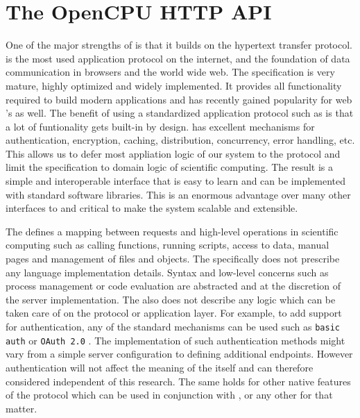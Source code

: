 \section{The OpenCPU HTTP API}

One of the major strengths of \OpenCPU is that it builds on the hypertext transfer protocol. \HTTP is the most used application protocol on the internet, and the foundation of data communication in browsers and the world wide web. The \HTTP specification is very mature, highly optimized and widely implemented. It provides all functionality required to build modern applications and has recently gained popularity for web \API's as well. The benefit of using a standardized application protocol such as \HTTP is that a lot of funtionality gets built-in by design. \HTTP has excellent mechanisms for authentication, encryption, caching, distribution, concurrency, error handling, etc. This allows us to defer most appliation logic of our system to the protocol and limit the \API specification to domain logic of scientific computing. The result is a simple and interoperable interface that is easy to learn and can be implemented with standard \HTTP software libraries. This is an enormous advantage over many other interfaces to \R and critical to make the system scalable and extensible. 

The \OpenCPU \API defines a mapping between \HTTP requests and high-level operations in scientific computing such as calling functions, running scripts, access to data, manual pages and management of files and objects. The \API specifically does not prescribe any language implementation details. Syntax and low-level concerns such as process management or code evaluation are abstracted and at the discretion of the server implementation. The \API also does not describe any logic which can be taken care of on the protocol or application layer. For example, to add support for authentication, any of the standard mechanisms can be used such as \texttt{basic auth} \citep{franks1999rfc} or \texttt{OAuth 2.0} \citep{hardt2012oauth}. The implementation of such authentication methods might vary from a simple server configuration to defining additional endpoints. However authentication will not affect the meaning of the \API itself and can therefore considered independent of this research. The same holds for other native features of the \HTTP protocol which can be used in conjunction with \OpenCPU, or any other \HTTP \API for that matter. 

